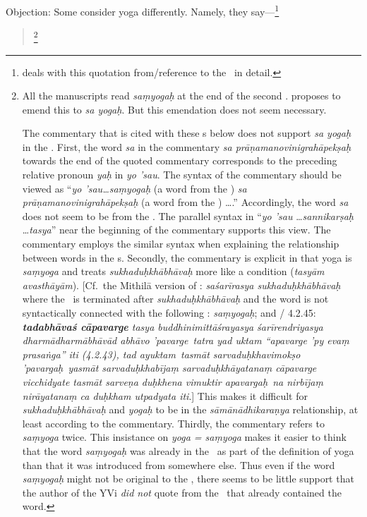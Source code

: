 Objection:%
 Some consider yoga differently.  Namely, they say---\footnote{\citet{wezler:yviandvs} deals with this
quotation from/reference to the \VS\ in detail.}
\begin{quotation}
		\footnote{All the manuscripts read \emph{saṃyogaḥ} at the end of the second \sutra.  \citet{wezler:yviandvs} proposes to emend this to \emph{sa yogaḥ}.  But this emendation does not seem necessary.%

		The commentary that is cited with these \sutra s below does not support \emph{sa yogaḥ} in the \sutra.  First, the word \emph{sa} in the commentary \emph{sa prāṇamanovinigrahāpekṣaḥ} towards the end of the quoted commentary corresponds to the preceding relative pronoun \emph{yaḥ} in \emph{yo ’sau}.  The syntax of the commentary should be viewed as ``\emph{yo ’sau\ldots saṃyogaḥ} (a word from the \sutra) \emph{sa prāṇamanovinigrahāpekṣaḥ} (a word from the \sutra) \ldots.''  Accordingly, the word \emph{sa} does not seem to be from the \sutra.  The parallel syntax in ``\emph{yo ’sau} \ldots \emph{sannikarṣaḥ} \ldots \emph{tasya}'' near the beginning of the commentary supports this view.  The commentary employs the similar syntax when explaining the relationship between words in the \sutra s. %
		Secondly, the commentary is explicit in that yoga is \emph{saṃyoga\/} and treats \emph{sukhaduḥkhābhāvaḥ} more like a condition (\emph{tasyām avasthāyām}).  [Cf.\ the Mithilā version of : \emph{saśarīrasya sukhaduḥkhābhāvaḥ\dd} \citep[113]{vs} where the \sutra\ is terminated after \emph{sukhaduḥkhābhāvaḥ} and the word is not syntactically connected with the following \sutra: \emph{saṃyogaḥ\dd}; and / 4.2.45: \emph{\textbf{tadabhāvaś cāpavarge\ddd} tasya bu\-ddhi\-ni\-mittā\-śraya\-sya śa\-rīre\-ndri\-ya\-sya dha\-rmā\-dharmā\-bhāvād a\-bhā\-vo ’pa\-va\-rge\dd\ ta\-tra yad u\-kta\-m ``apa\-varge ’py evaṃ pra\-saṅga'' iti (4.2.43), tad a\-yu\-ktam\dd\ tasmāt sarva\-duḥkha\-vi\-mokṣo 'pa\-vargaḥ\dd\ yasmāt sarva\-duḥkha\-bījaṃ sa\-rva\-duḥkhā\-ya\-ta\-naṃ cā\-pa\-varge vi\-cchi\-dyate tasmāt sa\-rve\-ṇa duḥkhe\-na vi\-mu\-ktir apa\-vargaḥ\dd\ na nirbī\-jaṃ ni\-rā\-yatanaṃ ca duḥ\-kham utpa\-dya\-ta iti\ddd}.]  This makes it difficult for \emph{sukhaduḥkhābhāvaḥ} and \emph{yogaḥ} to be in the \emph{sāmānādhikaraṇya\/} relationship, at least according to the commentary. %
		Thirdly, the commentary refers to \emph{saṃyoga\/} twice. This insistance on \emph{yoga = saṃyoga\/} makes it easier to think that the word \emph{saṃyogaḥ} was already in the \sutra\ as part of the definition of yoga than that it was introduced from somewhere else. %
		Thus even if the word \emph{saṃyogaḥ} might not be original to the \VS, there seems to be little support that the author of the YVi \emph{did not} quote from the \VS\ that already contained the word.%

}
\end{quotation}
